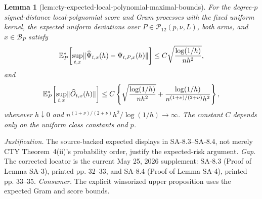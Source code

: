 \documentclass{article}
\newtheorem{lemma}{Lemma}
\begin{document}
\begin{lemma}[lem:cty-expected-local-polynomial-maximal-bounds]\label{lem:cty-expected-local-polynomial-maximal-bounds}
For the degree-\(p\) signed-distance local-polynomial score and Gram processes with the fixed uniform kernel, the expected uniform deviations over \(P\in\mathcal P_{12}(p,\nu,L)\), both arms, and \(x\in\mathcal B_P\) satisfy
\[
 \mathbb E_P^*\!\left[\sup_{t,x}\lVert\widehat\Psi_{t,x}(h)-\Psi_{t,P,x}(h)\rVert\right]
 \leq C\sqrt{{\log(1/h)\over nh^2}},
\]
and
\[
 \mathbb E_P^*\!\left[\sup_{t,x}\lVert\widehat O_{t,x}(h)\rVert\right]
 \leq C\left\{
 \sqrt{{\log(1/h)\over nh^2}}
 +{\log(1/h)\over n^{(1+\nu)/(2+\nu)}h^2}
 \right\},
\]
whenever \(h\downarrow0\) and \(n^{(1+\nu)/(2+\nu)}h^2/\log(1/h)\to\infty\).  The constant \(C\) depends only on the uniform class constants and \(p\).
\end{lemma}
\par\smallskip\noindent \textit{Justification.} The source-backed expected displays in SA-8.3--SA-8.4, not merely CTY Theorem~4(ii)'s probability order, justify the expected-risk argument. \textit{Gap.} The corrected locator is the current May 25, 2026 supplement: SA-8.3 (Proof of Lemma SA-3), printed pp. 32--33, and SA-8.4 (Proof of Lemma SA-4), printed pp. 33--35. \textit{Consumer.} The explicit winsorized upper proposition uses the expected Gram and score bounds.
\end{document}
